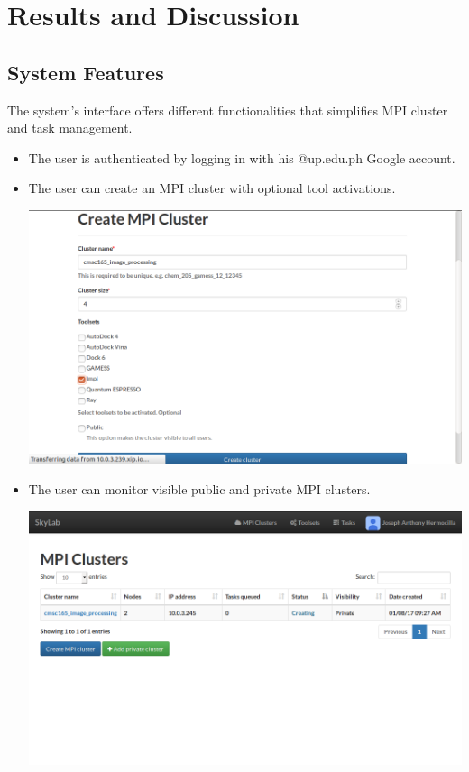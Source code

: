 	
\section{Results and Discussion}


          
\subsection{System Features}
The system's interface offers different functionalities that simplifies MPI cluster and task management.
		
	\begin{itemize}
		\item The user is authenticated by logging in with his @up.edu.ph Google account.
		\item The user can create an MPI cluster with optional tool activations. 
			\begin{center}			
				\includegraphics[scale=0.93]{./images/n_create_cluster_impi_printed.png}
			\end{center}	
	
		\item The user can monitor visible public and private MPI clusters.  \newline	
		\begin{center}			
			\includegraphics{./images/n_active_cluster_printed.png}
		\end{center}
		

\end{itemize}
